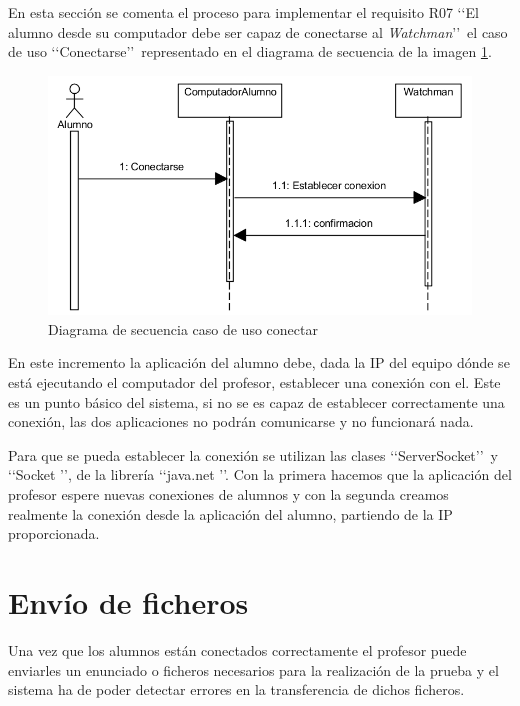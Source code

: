 En esta sección se comenta el proceso para implementar el requisito R07 \lq \lq El alumno desde su computador debe ser capaz de conectarse al \emph{Watchman}\rq \rq \ el caso de uso \lq \lq Conectarse\rq \rq \ representado en el diagrama de secuencia de la imagen \ref{fig:iteracion1:casosUso}. 
\newline

\begin{figure}
    \centering
    \includegraphics[width=.90\linewidth]{iteracion1/secConectar}
    \caption{Diagrama de secuencia caso de uso conectar}
    \label{fig:iteracion1:casosUso}
\end{figure}

En este incremento la aplicación del alumno debe, dada la IP del equipo dónde se está ejecutando el computador del profesor, establecer una conexión con el. Este es un punto básico del sistema, si no se es capaz de establecer correctamente una conexión, las dos aplicaciones no podrán comunicarse y no funcionará nada. 

Para que se pueda establecer la conexión se utilizan las clases \lq \lq ServerSocket\rq \rq \  y \lq \lq Socket \rq \rq, de la librería \lq \lq java.net \rq \rq. Con la primera hacemos que la aplicación del profesor espere nuevas conexiones de alumnos y con la segunda creamos realmente la conexión desde la aplicación del alumno, partiendo de la IP proporcionada.


\section{Envío de ficheros}
\label{sec:iteracion1:envio}

Una vez que los alumnos están conectados correctamente el profesor puede enviarles un enunciado o ficheros necesarios para la realización de la prueba y el sistema ha de poder detectar errores en la transferencia de dichos ficheros.
\newline
{}

